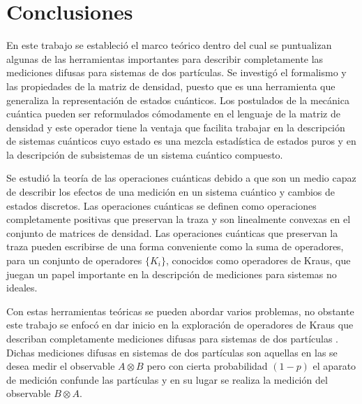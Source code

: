 \chapter{Conclusiones }

En este trabajo se estableció el marco teórico dentro del cual se puntualizan
algunas de las herramientas importantes para describir completamente las
mediciones difusas para sistemas de dos partículas.  Se investigó el formalismo
y las propiedades de la matriz de densidad, puesto que es una herramienta que
generaliza la representación de estados cuánticos. Los postulados de la
mecánica cuántica pueden ser reformulados cómodamente en el lenguaje de la
matriz de densidad y este operador tiene la ventaja que facilita trabajar en la
descripción de sistemas cuánticos cuyo estado es una mezcla estadística de
estados puros y en la descripción de subsistemas de un sistema cuántico
compuesto. 

Se estudió la teoría de las operaciones cuánticas debido a que son un medio
capaz de describir los efectos de una medición en un sistema cuántico y cambios
de estados discretos. 
Las operaciones cuánticas se definen como operaciones
completamente positivas que preservan la traza y son linealmente convexas en el
conjunto de matrices de densidad. Las operaciones cuánticas que preservan la
traza pueden escribirse de una forma conveniente como la suma de operadores,
para un conjunto de operadores $\{K_i\}$, conocidos como operadores de Kraus,
que juegan un papel importante en la descripción de mediciones para sistemas no
ideales. 

Con estas herramientas teóricas se pueden abordar varios problemas, no obstante
este trabajo se enfocó en dar inicio en la exploración de operadores de Kraus
que describan completamente mediciones difusas para sistemas de dos partículas
.
Dichas mediciones difusas en sistemas de dos partículas son aquellas en las se
desea medir el observable $A\otimes B$ pero con cierta probabilidad $(1-p)$ el
aparato de medición confunde las partículas y en su lugar se realiza la
medición del observable $B\otimes A $.  

